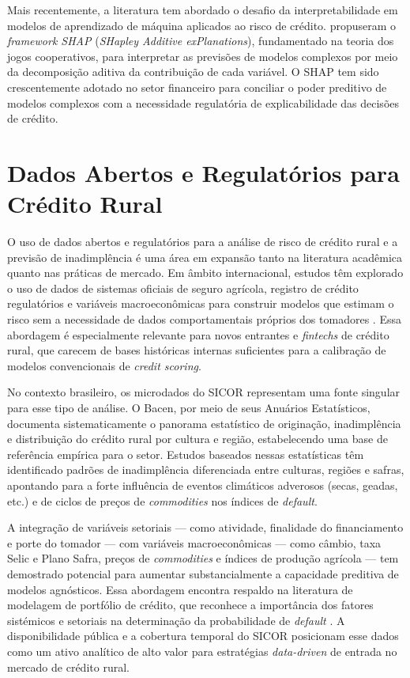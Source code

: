 Mais recentemente, a literatura tem abordado o desafio da interpretabilidade em modelos de aprendizado de máquina aplicados ao risco de crédito. \cite{lundberg&lee2017} propuseram o \textit{framework SHAP} (\textit{SHapley Additive exPlanations}), fundamentado na teoria dos jogos cooperativos, para interpretar as previsões de modelos complexos por meio da decomposição aditiva da contribuição de cada variável. O SHAP tem sido crescentemente adotado no setor financeiro para conciliar o poder preditivo de modelos complexos com a necessidade regulatória de explicabilidade das decisões de crédito.

\section{Dados Abertos e Regulatórios para Crédito Rural}

O uso de dados abertos e regulatórios para a análise de risco de crédito rural e a previsão de inadimplência é uma área em expansão tanto na literatura acadêmica quanto nas práticas de mercado. Em âmbito internacional, estudos têm explorado o uso de dados de sistemas oficiais de seguro agrícola, registro de crédito regulatórios e variáveis macroeconômicas para construir modelos que estimam o risco sem a necessidade de dados comportamentais próprios dos tomadores \cite{barry&ellinger2011}. Essa abordagem é especialmente relevante para novos entrantes e \textit{fintechs} de crédito rural, que carecem de bases históricas internas suficientes para a calibração de modelos convencionais de \textit{credit scoring}.

No contexto brasileiro, os microdados do SICOR representam uma fonte singular para esse tipo de análise. O Bacen, por meio de seus Anuários Estatísticos, documenta sistematicamente o panorama estatístico de originação, inadimplência e distribuição do crédito rural por cultura e região, estabelecendo uma base de referência empírica para o setor. Estudos baseados nessas estatísticas têm identificado padrões de inadimplência diferenciada entre culturas, regiões e safras, apontando para a forte influência de eventos climáticos adverosos (secas, geadas, etc.) e de ciclos de preços de \textit{commodities} nos índices de \textit{default}.

A integração de variáveis setoriais — como atividade, finalidade do financiamento e porte do tomador — com variáveis macroeconômicas — como câmbio, taxa Selic e Plano Safra, preços de \textit{commodities} e índices de produção agrícola — tem demostrado potencial para aumentar substancialmente a capacidade preditiva de modelos agnósticos. Essa abordagem encontra respaldo na literatura de modelagem de portfólio de crédito, que reconhece a importância dos fatores sistémicos e setoriais na determinação da probabilidade de \textit{default} \cite{thomasetal2002}. A disponibilidade pública e a cobertura temporal do SICOR posicionam esse dados como um ativo analítico de alto valor para estratégias \textit{data-driven} de entrada no mercado de crédito rural.

